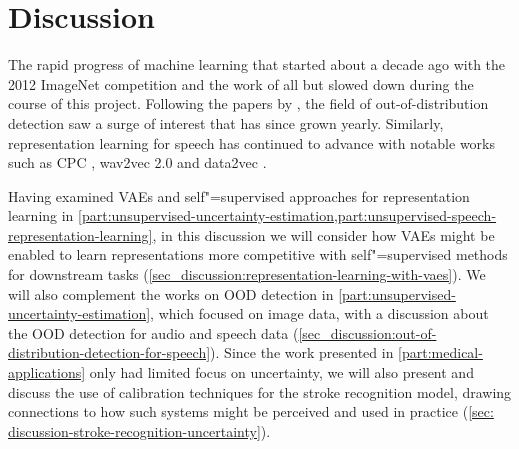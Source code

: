 
\chapter[discussion]{Discussion}\label{chp:discussion}

The rapid progress of machine learning that started about a decade ago with the 2012 ImageNet competition and the work of \textcite{krizhevsky_imagenet_2012} all but slowed down during the course of this project. 
Following the papers by \textcite{choi_waic_2019,nalisnick_detecting_2019,hendrycks_deep_2019}, the field of out-of-distribution detection saw a surge of interest that has since grown yearly. Similarly, representation learning for speech has continued to advance with notable works such as CPC \parencite{oord_representation_2018}, wav2vec 2.0 \parencite{baevski_wav2vec_2020} and data2vec \parencite{baevski_data2vec_2022}. 

Having examined VAEs and self"=supervised approaches for representation learning in \cref{part:unsupervised-uncertainty-estimation,part:unsupervised-speech-representation-learning}, in this discussion we will consider how VAEs might be enabled to learn representations more competitive with self"=supervised methods for downstream tasks (\cref{sec_discussion:representation-learning-with-vaes}). 
We will also complement the works on OOD detection in \cref{part:unsupervised-uncertainty-estimation}, which focused on image data, with a discussion about the OOD detection for audio and speech data (\cref{sec_discussion:out-of-distribution-detection-for-speech}). 
Since the work presented in \cref{part:medical-applications} only had limited focus on uncertainty, we will also present and discuss the use of calibration techniques for the stroke recognition model, drawing connections to how such systems might be perceived and used in practice (\cref{sec: discussion-stroke-recognition-uncertainty}). 

